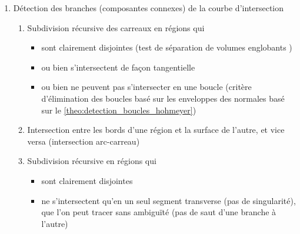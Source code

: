 \begin{enumerate}
	\item Détection des branches (composantes connexes) de la courbe d'intersection
	\begin{enumerate}
		\item Subdivision récursive des carreaux en régions qui
		\begin{itemize}
			\item sont clairement disjointes (test de séparation de volumes englobants \cite{eberly1999})
			\item ou bien s'intersectent de façon tangentielle
			\item ou bien ne peuvent pas s'intersecter en une boucle (critère d'élimination des boucles basé sur les enveloppes des normales basé sur le \autoref{theo:detection_boucles_hohmeyer})
		\end{itemize}
		\item Intersection entre les bords d'une région et la surface de l'autre, et vice versa (intersection arc-carreau)
		\item Subdivision récursive en régions qui
		\begin{itemize}
			\item sont clairement disjointes
			\item ne s'intersectent qu'en un seul segment transverse (pas de singularité), que l'on peut tracer sans ambiguïté (pas de saut d'une branche à l'autre)
		\end{itemize}
	\end{enumerate}
	


\end{enumerate}

